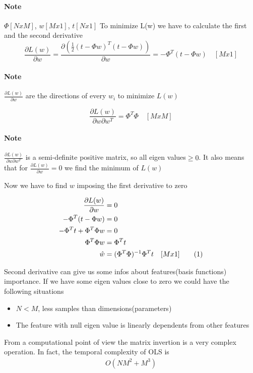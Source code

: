 \documentclass[main.tex]{subfiles}
\newcommand\numberthis{\addtocounter{equation}{1}\tag{\theequation}}
\begin{document}
\paragraph{Note} $\Phi[NxM]$, $w[Mx1]$, $t[Nx1]$
\newline
To minimize L(w) we have to calculate the first and the second derivative
\begin{equation}
    \frac{\partial L(w)}{\partial w}=\frac{\partial(\frac{1}{2}(t-\Phi w)^T(t-\Phi w))}{\partial w} = -\Phi^T(t-\Phi w) \quad[Mx1]
\end{equation}

\paragraph{Note} $\frac{\partial L(w)}{\partial w}$ are the directions of every $w_i$ to minimize $L(w)$

\begin{equation}
    \frac{\partial L(w)}{\partial w \partial w^T}=\Phi^T\Phi \quad [MxM]
\end{equation}

\paragraph{Note} $\frac{\partial L(w)}{\partial w \partial w^T}$ is a semi-definite positive matrix\footnotemark, so all eigen values$\geq0$. It also means that for $\frac{\partial L(w)}{\partial w}=0$ we find the minimum of $L(w)$


Now we have to find $w$ imposing the first derivative to zero

\begin{align*}
    \frac{\partial L(w)}{\partial w}&=0\\
    -\Phi^T(t-\Phi w)&=0\\
    -\Phi^Tt+\Phi^T\Phi w &=0\\
    \Phi^T\Phi w&=\Phi^Tt\\
    \hat{w}&=(\Phi^T\Phi)^{-1}\Phi^Tt \quad [Mx1] \numberthis
\end{align*}

Second derivative can give us some infos about features(basis functions) importance. If we have some eigen values close to zero we could have the following situations
\begin{itemize}
    \item $N<M$, less samples than dimensions(parameters)
    \item The feature with null eigen value is linearly dependents from other features
\end{itemize}
From a computational point of view the matrix invertion is a very complex operation. In fact, the temporal complexity of OLS is
\begin{align*}
    O(NM^2+M^3)
\end{align*}
\end{document}

